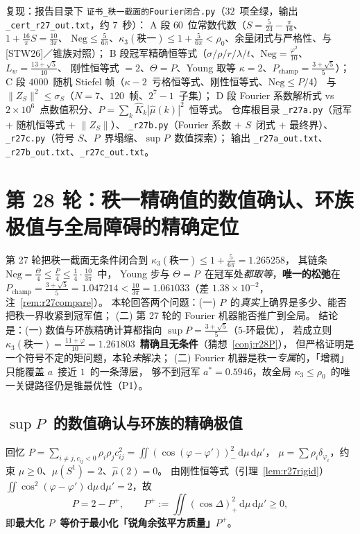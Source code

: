 \documentclass[UTF8,11pt]{ctexart}
\theoremstyle{definition}
\newcommand{\dd}{\,\mathrm{d}}
\newcommand{\STW}{\textup{[STW26]}}
\begin{document}
复现：报告目录下 \texttt{证书\_秩一截面的Fourier闭合.py}（$32$~项全绿，输出 \texttt{\_cert\_r27\_out.txt}，约 $7$~秒）：
A 段 $60$~位常数代数（$S=\frac5{24}-\frac\pi{16}$、$1+\frac{16}\pi S=\frac{10}{3\pi}$、
$\mathrm{Neg}\le\frac5{6\pi}$、$\kappa_3(\text{秩一})\le1+\frac5{6\pi}<\rho_0$、余量闭式与严格性、与 \STW／锥族对照）；
B 段冠军精确恒等式（$\sigma/\rho/r/\lambda/t$、$\mathrm{Neg}=\frac{\varphi^2}{10}$、$L_w=\frac{13+\sqrt5}{10}$、
刚性恒等式 $=2$、$\Theta=P$、Young 取等 $\kappa=2$、$P_{\text{champ}}=\frac{3+\sqrt5}5$）；
C 段 $4000$~随机 Stiefel 帧（$\kappa-2$~亏格恒等式、刚性恒等式、$\mathrm{Neg}\le P/4$）
与 $\|Z_S\|^2\le\sigma_S$（$N=7$、$120$~帧、$2^7-1$~子集）；
D 段 Fourier 系数解析式 vs $2\times10^6$~点数值积分、$P=\sum_k\widehat K_k|\widehat\mu(k)|^2$~恒等式。
仓库根目录 \texttt{\_r27a.py}（冠军 $+$ 随机恒等式 $+$ $\|Z_S\|$）、
\texttt{\_r27b.py}（Fourier 系数 $+$ $S$~闭式 $+$ 最终界）、
\texttt{\_r27c.py}（符号 $S$、$P$~界塌缩、$\sup P$~数值探索）；
输出 \texttt{\_r27a\_out.txt}、\texttt{\_r27b\_out.txt}、\texttt{\_r27c\_out.txt}。


\section{第 28 轮：秩一精确值的数值确认、环族极值与全局障碍的精确定位}\label{sec:r28}

第 27 轮把秩一截面无条件闭合到 $\kappa_3(\text{秩一})\le1+\frac5{6\pi}=1.265258$，
其链条 $\mathrm{Neg}=\frac\Theta4\le\frac P4\le\frac14\cdot\frac{10}{3\pi}$~中，
Young 步与 $\Theta=P$~在冠军处\emph{都取等}，\textbf{唯一的松弛}在
$P_{\text{champ}}=\frac{3+\sqrt5}5=1.047214<\frac{10}{3\pi}=1.061033$（差 $1.38\times10^{-2}$，注~\ref{rem:r27compare}）。
本轮回答两个问题：(一) $P$~的\emph{真实}上确界是多少、能否把秩一界收紧到冠军值；
(二) 第 27 轮的 Fourier 机器能否推广到全局。
结论是：(一) 数值与环族精确计算都指向 $\sup P=\frac{3+\sqrt5}5$（$5$-环最优），
若成立则 $\kappa_3(\text{秩一})=\frac{11+\varphi}{10}=1.261803$~\textbf{精确且无条件}（猜想~\ref{conj:r28P}），
但严格证明是一个符号不定的矩问题，本轮\emph{未}解决；
(二) Fourier 机器是秩一\emph{专属}的，「增稠」只能覆盖 $a$~接近 $1$~的一条薄层，
够不到冠军 $a^*=0.5946$，故全局 $\kappa_3\le\rho_0$~的唯一关键路径仍是锥最优性（P1）。

\subsection{$\sup P$~的数值确认与环族的精确极值}\label{sec:r28:supP}

回忆 $P=\sum_{i\ne j,c_{ij}<0}\rho_i\rho_jc_{ij}^2=\iint(\cos(\varphi-\varphi'))_-^2\dd\mu\dd\mu'$，
$\mu=\sum\rho_i\delta_{\varphi_i}$，约束 $\mu\ge0$、$\mu(S^1)=2$、$\widehat\mu(2)=0$。
由刚性恒等式（引理~\ref{lem:r27rigid}）$\iint\cos^2(\varphi-\varphi')\dd\mu\dd\mu'=2$，故
\begin{equation}\label{eq:r28Pplus}
P=2-P^+,\qquad P^+:=\iint(\cos\Delta)_+^2\dd\mu\dd\mu'\ge0,
\end{equation}
即\textbf{最大化 $P$~等价于最小化「锐角余弦平方质量」$P^+$}。
\end{document}
